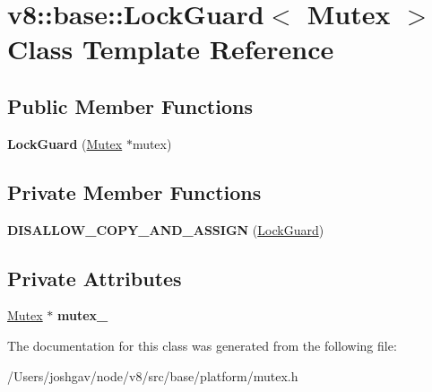 \hypertarget{classv8_1_1base_1_1_lock_guard}{}\section{v8\+:\+:base\+:\+:Lock\+Guard$<$ Mutex $>$ Class Template Reference}
\label{classv8_1_1base_1_1_lock_guard}
\subsection*{Public Member Functions}
\begin{DoxyCompactItemize}
\item 
{\bfseries Lock\+Guard} (\hyperlink{classv8_1_1base_1_1_mutex}{Mutex} $\ast$mutex)\hypertarget{classv8_1_1base_1_1_lock_guard_aaacaa3ad217e22cde357619445ff486e}{}\label{classv8_1_1base_1_1_lock_guard_aaacaa3ad217e22cde357619445ff486e}

\end{DoxyCompactItemize}
\subsection*{Private Member Functions}
\begin{DoxyCompactItemize}
\item 
{\bfseries D\+I\+S\+A\+L\+L\+O\+W\+\_\+\+C\+O\+P\+Y\+\_\+\+A\+N\+D\+\_\+\+A\+S\+S\+I\+GN} (\hyperlink{classv8_1_1base_1_1_lock_guard}{Lock\+Guard})\hypertarget{classv8_1_1base_1_1_lock_guard_a7811d8ff9b4c5d7323f16ffd3f07523e}{}\label{classv8_1_1base_1_1_lock_guard_a7811d8ff9b4c5d7323f16ffd3f07523e}

\end{DoxyCompactItemize}
\subsection*{Private Attributes}
\begin{DoxyCompactItemize}
\item 
\hyperlink{classv8_1_1base_1_1_mutex}{Mutex} $\ast$ {\bfseries mutex\+\_\+}\hypertarget{classv8_1_1base_1_1_lock_guard_a4850c2634bf5545ac8464c677d9073de}{}\label{classv8_1_1base_1_1_lock_guard_a4850c2634bf5545ac8464c677d9073de}

\end{DoxyCompactItemize}


The documentation for this class was generated from the following file\+:\begin{DoxyCompactItemize}
\item 
/\+Users/joshgav/node/v8/src/base/platform/mutex.\+h\end{DoxyCompactItemize}
